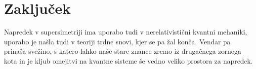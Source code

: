 \section{Zaklju\v cek}

Napredek v supersimetriji ima uporabo tudi v nerelativisti\v cni kvantni mehaniki, uporabo je na\v sla tudi
v teoriji trdne snovi, kjer se pa \v zal kon\v ca. Vendar pa prina\v sa sve\v zino, s katero lahko na\v se
stare znance zremo iz druga\v cnega zornega kota in je kljub omejitvi na kvantne sisteme \v se vedno veliko
prostora za napredek.
